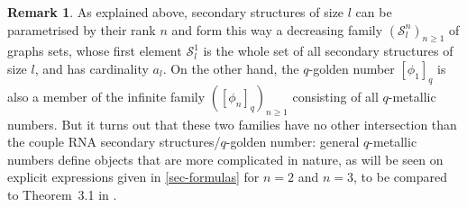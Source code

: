 \documentclass[11pt,reqno]{amsart}
\theoremstyle{plain}
\theoremstyle{definition}
\newtheorem{remarque}[lemme]{Remark}
\numberwithin{figure}{section}
\numberwithin{table}{section}
\numberwithin{equation}{section}
\begin{document}
\begin{remarque}
As explained above, secondary structures of size $l$ can be parametrised by their rank $n$ and form this way a decreasing family $({\mathcal S}^{n}_l)_{n≥1}$ of graphs sets, whose first element ${\mathcal S}^{1}_l$ is the whole set of all secondary structures of size $l$, and has cardinality $a_l$.
On the other hand, the $q$-golden number $[\phi_1]_q$ is also a member of the infinite family $([\phi_n]_q)_{n≥1}$ consisting of all $q$-metallic numbers. But it turns out that these two families have no other intersection than the couple RNA secondary structures/$q$-golden number: general $q$-metallic numbers define objects that are  more complicated in nature, as will be seen on explicit expressions given in \cref{sec-formulas} for $n=2$ and $n=3$, to be compared to Theorem~3.1 in \cite{DSV04}.
\end{remarque}
\end{document}
